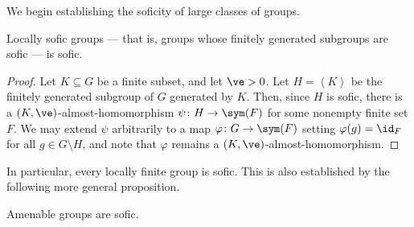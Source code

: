 \documentclass[10pt]{mypackage}
\begin{document}
We begin establishing the soficity of large classes of groups.
\begin{theorem}
  Locally sofic groups --- that is, groups whose finitely generated subgroups are sofic --- is sofic.
\end{theorem}
\begin{proof}
  Let $K\subseteq G$ be a finite subset, and let $\ve > 0$. Let $H = \left\langle K \right\rangle$ be the finitely generated subgroup of $G$ generated by $K$. Then, since $H$ is sofic, there is a $\left( K,\ve \right)$-almost-homomorphism $\psi\colon H\rightarrow \sym(F)$ for some nonempty finite set $F$. We may extend $\psi$ arbitrarily to a map $\varphi\colon G\to \sym(F)$ setting $\varphi(g) = \id_F$ for all $g\in G\setminus H$, and note that $\varphi$ remains a $\left( K,\ve \right)$-almost-homomorphism.
\end{proof}
In particular, every locally finite group is sofic. This is also established by the following more general proposition.
\begin{proposition}
  Amenable groups are sofic.
\end{proposition}
\end{document}
